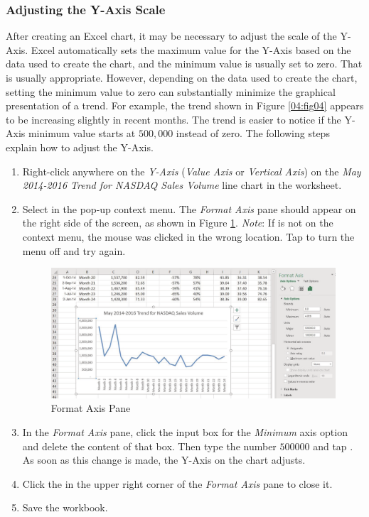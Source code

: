 \subsubsection{Adjusting the Y-Axis Scale}

After creating an Excel chart, it may be necessary to adjust the scale of the Y-Axis. Excel automatically sets the maximum value for the Y-Axis based on the data used to create the chart, and the minimum value is usually set to zero. That is usually appropriate. However, depending on the data used to create the chart, setting the minimum value to zero can substantially minimize the graphical presentation of a trend. For example, the trend shown in Figure \ref{04:fig04} appears to be increasing slightly in recent months. The trend is easier to notice if the Y-Axis minimum value starts at $ 500,000 $ instead of zero. The following steps explain how to adjust the Y-Axis.

\begin{enumbox}
	\begin{enumerate}
		\item Right-click anywhere on the \textit{Y-Axis} (\textit{Value Axis} or \textit{Vertical Axis}) on the \textit{May 2014-2016 Trend for NASDAQ Sales Volume} line chart in the  worksheet.
		\item Select  in the pop-up context menu. The \textit{Format Axis} pane should appear on the right side of the screen, as shown in Figure \ref{04:fig05}. \textit{Note}: If  is not on the context menu, the mouse was clicked in the wrong location. Tap  to turn the menu off and try again.
	
		\begin{figure}[H]
			\centering
			\includegraphics[width=\maxwidth{.95\linewidth}]{gfx/ch04_fig05}
			\caption{Format Axis Pane}
			\label{04:fig05}
		\end{figure}
	
		\item In the \textit{Format Axis} pane, click the input box for the \textit{Minimum} axis option and delete the content of that box. Then type the number $ 500000 $ and tap . As soon as this change is made, the Y-Axis on the chart adjusts.
		\item Click the  in the upper right corner of the \textit{Format Axis} pane to close it.
		\item Save the  workbook.
	\end{enumerate}
\end{enumbox}
	
